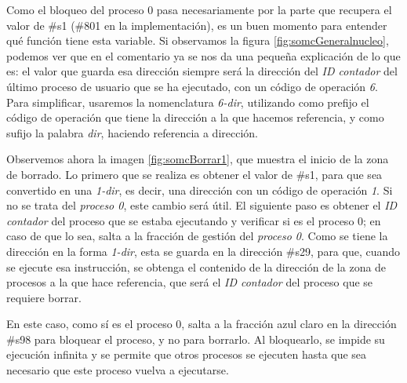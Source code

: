 \documentclass[letterpaper,12pt,oneside]{book}
\begin{document}
        
        Como
		el bloqueo del proceso 0 pasa necesariamente por la parte que recupera el valor de \#s1 (\#801 en la implementación), es un buen momento para 
		entender
		qué función tiene esta variable. Si observamos la figura \ref{fig:somcGeneralnucleo}, podemos
		ver que en el comentario ya se nos da una pequeña explicación de lo que es: el valor que guarda esa dirección siempre será la dirección
		del \textit{ID contador} del último proceso de usuario que se ha ejecutado, con un código de operación \textit{6}. Para simplificar, 
		usaremos la nomenclatura
		\textit{6-dir}, utilizando como prefijo el código de operación que tiene la dirección a la que hacemos referencia, y como sufijo
		la palabra \textit{dir}, haciendo referencia a dirección.
  
        Observemos ahora la
		imagen \ref{fig:somcBorrar1}, que muestra el inicio de la zona de borrado. Lo primero que se realiza es obtener el valor de \#s1, 
		para que sea convertido
		en una \textit{1-dir}, es decir, una dirección con un código de operación \textit{1}. Si no se trata del \textit{proceso 0}, este cambio
		será útil. El siguiente paso es  obtener el \textit{ID contador} del proceso que se estaba ejecutando y verificar si es el proceso
		0; en caso de que lo sea, salta a la fracción de gestión del \textit{proceso 0}. Como se tiene la dirección en 
		la forma \textit{1-dir}, esta se guarda en 
		la dirección \#s29, para
        que, cuando se ejecute esa instrucción, se obtenga el contenido de la dirección de la zona de procesos
        a la que hace referencia, que será el \textit{ID contador} del proceso que se requiere borrar.
  
        En este caso, como sí es el proceso 0, salta a la fracción azul claro en la dirección \#s98 para bloquear el proceso, y no 
		para borrarlo. Al bloquearlo, se impide su ejecución infinita y se permite que otros procesos se ejecuten hasta que sea necesario que este 
		proceso vuelva a ejecutarse.
\end{document}
